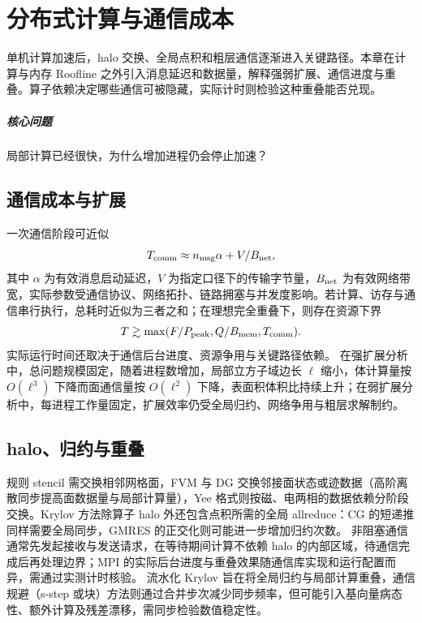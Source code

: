 \chapter{分布式计算与通信成本}\label{v0ch:28}
\begin{chaptersummary}
单机计算加速后，halo 交换、全局点积和粗层通信逐渐进入关键路径。本章在计算与内存 Roofline 之外引入消息延迟和数据量，解释强弱扩展、通信进度与重叠。算子依赖决定哪些通信可被隐藏，实际计时则检验这种重叠能否兑现。
\end{chaptersummary}
\paragraph{核心问题}局部计算已经很快，为什么增加进程仍会停止加速？

\section{通信成本与扩展}
一次通信阶段可近似
\[
 T_{\rm comm}\approx n_{\rm msg}\alpha+V/B_{\rm net},
\]
其中 $\alpha$ 为有效消息启动延迟，$V$ 为指定口径下的传输字节量，$B_{\rm net}$ 为有效网络带宽，实际参数受通信协议、网络拓扑、链路拥塞与并发度影响。若计算、访存与通信串行执行，总耗时近似为三者之和；在理想完全重叠下，则存在资源下界
\[
 T\gtrsim\max(F/P_{\rm peak},Q/B_{\rm mem},T_{\rm comm}).
\]
实际运行时间还取决于通信后台进度、资源争用与关键路径依赖。
在强扩展分析中，总问题规模固定，随着进程数增加，局部立方子域边长 $\ell$ 缩小，体计算量按 $O(\ell^3)$ 下降而面通信量按 $O(\ell^2)$ 下降，表面积体积比持续上升；在弱扩展分析中，每进程工作量固定，扩展效率仍受全局归约、网络争用与粗层求解制约。
\section{halo、归约与重叠}
规则 stencil 需交换相邻网格面，FVM 与 DG 交换邻接面状态或迹数据（高阶离散同步提高面数据量与局部计算量），Yee 格式则按磁、电两相的数据依赖分阶段交换。Krylov 方法除算子 halo 外还包含点积所需的全局 allreduce：CG 的短递推同样需要全局同步，GMRES 的正交化则可能进一步增加归约次数。
非阻塞通信通常先发起接收与发送请求，在等待期间计算不依赖 halo 的内部区域，待通信完成后再处理边界；MPI 的实际后台进度与重叠效果随通信库实现和运行配置而异，需通过实测计时核验。\cite{mpi}
流水化 Krylov 旨在将全局归约与局部计算重叠，通信规避（s-step 或块）方法则通过合并步次减少同步频率，但可能引入基向量病态性、额外计算及残差漂移，需同步检验数值稳定性。
